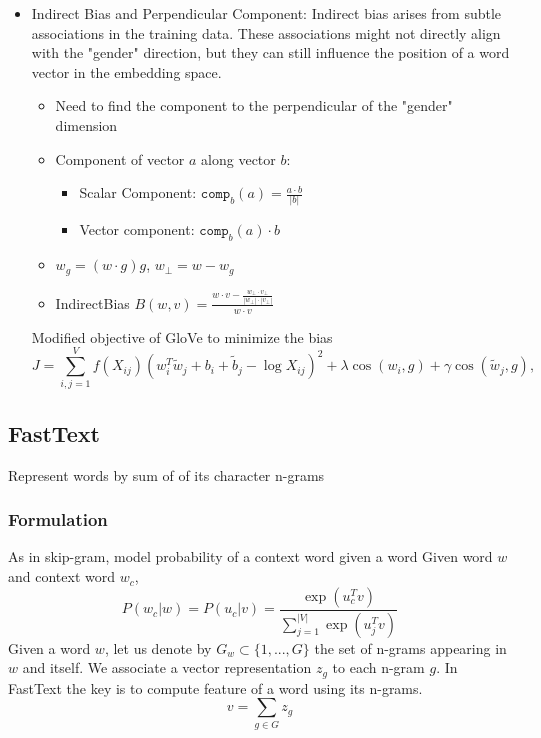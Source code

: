 \documentclass[12pt]{article}
\begin{document}
\begin{itemize}
                \item Indirect Bias and Perpendicular Component: Indirect bias arises from subtle associations in the training data. These associations might not directly align with the "gender" direction, but they can still influence the position of a word vector in the embedding space.
                \begin{mdframed}
                    \begin{itemize}
                        \item Need to find the component to the perpendicular of the "gender" dimension
                        \item Component of vector $a$ along vector $b$:
                        \begin{itemize}
                            \item Scalar Component: $\texttt{comp}_b(a) = \frac{a \cdot b}{|b|}$
                            \item Vector component: $\texttt{comp}_b(a) \cdot b$
                        \end{itemize}
                        \item $w_g = (w \cdot g)g$, $w_{\perp} = w - w_g$
                        \item IndirectBias $B(w,v) = \frac{w \cdot v - \frac{w_{\perp} \cdot v_{\perp}}{|w_{\perp}| \cdot |v_{\perp}|}}{w \cdot v}$
                    \end{itemize}
                \end{mdframed}
                Modified objective of GloVe to minimize the bias
                \[J = \sum_{i,j=1}^{V} f(X_{ij}) (w_i^T \tilde{w}_j + b_i + \tilde{b}_j - \log X_{ij})^2  + \lambda\cos(w_i, g) + \gamma\cos(\tilde{w}_j, g),\]
            \end{itemize}

    \subsection{FastText}  
        Represent words by sum of of its character n-grams
        \subsubsection{Formulation}
            As in skip-gram, model probability of a context word given a word
            Given word $w$ and context word $w_c$, 
            \[
                P(w_c|w) = P(u_c|v) = \frac{\exp(u_c^T v)}{\sum_{j=1}^{|V|} \exp(u_j^T v)}
            \]
            Given a word $w$, let us denote by $G_w \subset \{1, . . . , G\}$ the set of n-grams appearing in $w$ and itself. We associate a vector representation $z_g$ to each n-gram $g$.
            In FastText the key is to compute feature of a word using its n-grams.\
            \[
                v = \sum_{g \in G} z_g
            \]
\end{document}
